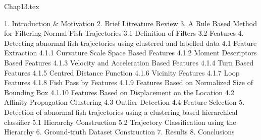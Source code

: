 Chap13.tex

1. Introductıon & Motivation
2. Brief Litreature Review
3. A Rule Based Method for Filtering Normal Fish Trajectories
3.1 Definition of Filters
3.2 Features
4. Detecting abnormal fish trajectories using clustered and labelled data
4.1 Feature Extraction
4.1.1 Curvature Scale Space Based Features
4.1.2 Moment Descriptors Based Features
4.1.3 Velocity and Acceleration Based Features
4.1.4 Turn Based Features
4.1.5 Centred Distance Function
4.1.6 Vicinity Features
4.1.7 Loop Features
4.1.8 Fish Pass by Features
4.1.9 Features Based on Normalized Size of Bounding Box
4.1.10 Features Based on Displacement on the Location
4.2 Affinity Propagation Clustering
4.3 Outlier Detection
4.4 Feature Selection
5. Detection of abnormal fish trajectories using a clustering based hierarchical classifier
5.1 Hierarchy Construction
5.2 Trajectory Classification using the Hierarchy
6. Ground-truth Dataset Construction
7. Results
8. Conclusions


